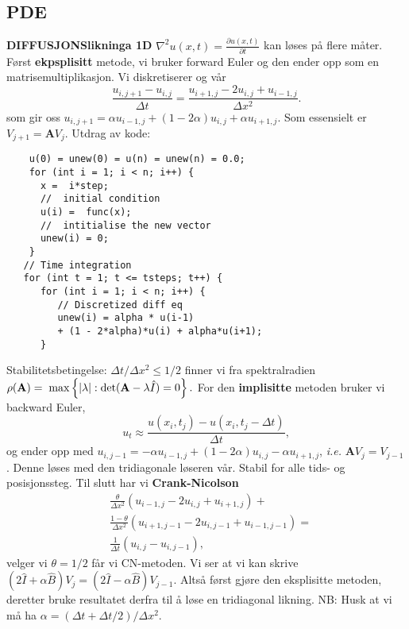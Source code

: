 \documentclass[12pt,a4paper,twocolumn]{article}
\begin{document}
\begin{flushleft}
\subsection{PDE} %
\label{sub:pde}
\textbf{DIFFUSJONSlikninga 1D} $\nabla^2 u(x,t) =\frac{\partial u(x,t)}{\partial t}$ kan løses på flere måter. Først \textbf{ekpsplisitt} metode, vi bruker forward Euler og den ender opp som en matrisemultiplikasjon. Vi diskretiserer og vår
\begin{equation*}
\frac{u_{i,j+1}-u_{i,j}}{\Delta t}=\frac{u_{i+1,j}-2u_{i,j}+u_{i-1,j}}{\Delta x^2}.
\end{equation*}
som gir oss $u_{i,j+1}= \alpha u_{i-1,j}+(1-2\alpha)u_{i,j}+\alpha u_{i+1,j}$. Som essensielt er $V_{j+1} = \mathbf{A}V_{j}$. Utdrag av kode:
\begin{verbatim}
	u(0) = unew(0) = u(n) = unew(n) = 0.0;
    for (int i = 1; i < n; i++) {
      x =  i*step;
      //  initial condition
      u(i) =  func(x);
      //  intitialise the new vector 
      unew(i) = 0;
    }
   // Time integration
   for (int t = 1; t <= tsteps; t++) {
      for (int i = 1; i < n; i++) {
         // Discretized diff eq
         unew(i) = alpha * u(i-1)
         + (1 - 2*alpha)*u(i) + alpha*u(i+1);
      }
\end{verbatim}
Stabilitetsbetingelse: $\Delta t/\Delta x^2 \le 1/2$ finner vi fra spektralradien $\rho(\mathbf{A}) = \hspace{0.1cm}\mathrm{max}\left\{|\lambda|:\mathrm{det}(\mathbf{A}-\lambda\hat{I})=0\right\}.$ For den \textbf{implisitte} metoden bruker vi backward Euler,
\begin{equation*}
u_t\approx \frac{u(x_i,t_j)-u(x_i,t_j-\Delta t)}{\Delta t},
\end{equation*}
og ender opp med $u_{i,j-1}= -\alpha u_{i-1,j}+(1-2\alpha)u_{i,j}-\alpha u_{i+1,j}$, \emph{i.e.} $\mathbf{A}V_{j} = V_{j-1}$. Denne løses med den tridiagonale løseren vår. Stabil for alle tids- og posisjonssteg. Til slutt har vi \textbf{Crank-Nicolson}
\begin{align*}
  &\frac{\theta}{\Delta x^2}\left(u_{i-1,j}-2u_{i,j}+u_{i+1,j}\right)+\\
  &\frac{1-\theta}{\Delta x^2}\left(u_{i+1,j-1}-2u_{i,j-1}+u_{i-1,j-1}\right)=\\
  &\frac{1}{\Delta t}\left(u_{i,j}-u_{i,j-1}\right),
\end{align*}
velger vi $\theta=1/2$ får vi CN-metoden. Vi ser at vi kan skrive $\left(2\hat{I}+\alpha\hat{B}\right)V_{j}=\left(2\hat{I}-\alpha\hat{B}\right)V_{j-1}$. Altså først gjøre den eksplisitte metoden, deretter bruke resultatet derfra til å løse en tridiagonal likning. NB: Husk at vi må ha $\alpha = (\Delta t + \Delta t/2) / \Delta x^2$.\\

\end{flushleft}
\end{document}
